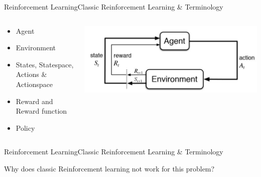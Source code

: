 \documentclass{beamer}
\begin{document}
\begin{frame}{Reinforcement Learning}{Classic Reinforcement Learning \& Terminology\vphantom{(y}}
\vspace{-0.7em}

\begin{columns}
    \begin{column}{0.48\textwidth}
      \begin{itemize}
      \item Agent
      \item Environment
      \item States, Statespace, Actions \& Actionspace
      \item Reward and Reward function
      \item Policy
      \end{itemize}
    \end{column}
    \begin{column}{0.48\textwidth}
        \includegraphics[width=1\textwidth]{images/rl_explained.jpg}
    \end{column}
\end{columns}
\end{frame}

\begin{frame}{Reinforcement Learning}{Classic Reinforcement Learning \& Terminology\vphantom{(y}}
\vspace{-0.7em}
\begin{centering}
  Why does classic Reinforcement learning not work for this problem?
\end{centering}

\end{frame}
\end{document}
